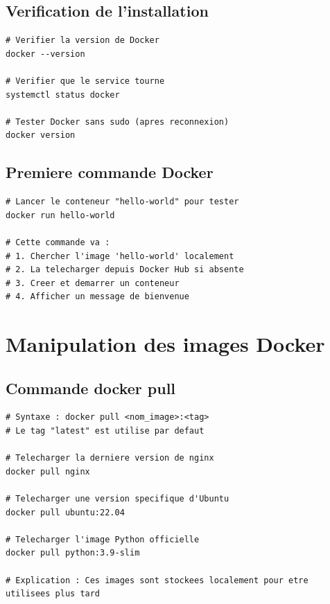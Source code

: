 \documentclass[a4paper,12pt]{article}
\begin{document}
\subsection{Verification de l'installation}
\begin{lstlisting}[caption=Verifier que Docker est bien installe]
# Verifier la version de Docker
docker --version

# Verifier que le service tourne
systemctl status docker

# Tester Docker sans sudo (apres reconnexion)
docker version
\end{lstlisting}

\subsection{Premiere commande Docker}
\begin{lstlisting}[caption=Premier conteneur]
# Lancer le conteneur "hello-world" pour tester
docker run hello-world

# Cette commande va :
# 1. Chercher l'image 'hello-world' localement
# 2. La telecharger depuis Docker Hub si absente
# 3. Creer et demarrer un conteneur
# 4. Afficher un message de bienvenue
\end{lstlisting}

\section{Manipulation des images Docker}

\subsection{Commande docker pull}
\begin{lstlisting}[caption=Telecharger des images]
# Syntaxe : docker pull <nom_image>:<tag>
# Le tag "latest" est utilise par defaut

# Telecharger la derniere version de nginx
docker pull nginx

# Telecharger une version specifique d'Ubuntu
docker pull ubuntu:22.04

# Telecharger l'image Python officielle
docker pull python:3.9-slim

# Explication : Ces images sont stockees localement pour etre utilisees plus tard
\end{lstlisting}
\end{document}
